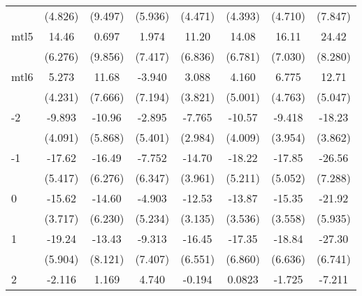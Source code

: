 \documentclass{article}
\begin{document}
{\begin{longtable}{l*{7}{c}}
                &  (4.826)         &  (9.497)         &  (5.936)         &  (4.471)         &  (4.393)         &  (4.710)         &  (7.847)         \\
mtl5            &    14.46\sym{*}  &    0.697         &    1.974         &    11.20         &    14.08         &    16.11\sym{*}  &    24.42\sym{*}  \\
                &  (6.276)         &  (9.856)         &  (7.417)         &  (6.836)         &  (6.781)         &  (7.030)         &  (8.280)         \\
mtl6            &    5.273         &    11.68         &   -3.940         &    3.088         &    4.160         &    6.775         &    12.71\sym{*}  \\
                &  (4.231)         &  (7.666)         &  (7.194)         &  (3.821)         &  (5.001)         &  (4.763)         &  (5.047)         \\
-2              &   -9.893\sym{*}  &   -10.96         &   -2.895         &   -7.765\sym{*}  &   -10.57\sym{*}  &   -9.418\sym{*}  &   -18.23\sym{***}\\
                &  (4.091)         &  (5.868)         &  (5.401)         &  (2.984)         &  (4.009)         &  (3.954)         &  (3.862)         \\
-1              &   -17.62\sym{**} &   -16.49\sym{*}  &   -7.752         &   -14.70\sym{**} &   -18.22\sym{**} &   -17.85\sym{**} &   -26.56\sym{**} \\
                &  (5.417)         &  (6.276)         &  (6.347)         &  (3.961)         &  (5.211)         &  (5.052)         &  (7.288)         \\
0               &   -15.62\sym{***}&   -14.60\sym{*}  &   -4.903         &   -12.53\sym{**} &   -13.87\sym{**} &   -15.35\sym{***}&   -21.92\sym{**} \\
                &  (3.717)         &  (6.230)         &  (5.234)         &  (3.135)         &  (3.536)         &  (3.558)         &  (5.935)         \\
1               &   -19.24\sym{**} &   -13.43         &   -9.313         &   -16.45\sym{*}  &   -17.35\sym{*}  &   -18.84\sym{*}  &   -27.30\sym{**} \\
                &  (5.904)         &  (8.121)         &  (7.407)         &  (6.551)         &  (6.860)         &  (6.636)         &  (6.741)         \\
2               &   -2.116         &    1.169         &    4.740         &   -0.194         &   0.0823         &   -1.725         &   -7.211         \\

\end{longtable}}
\end{document}
